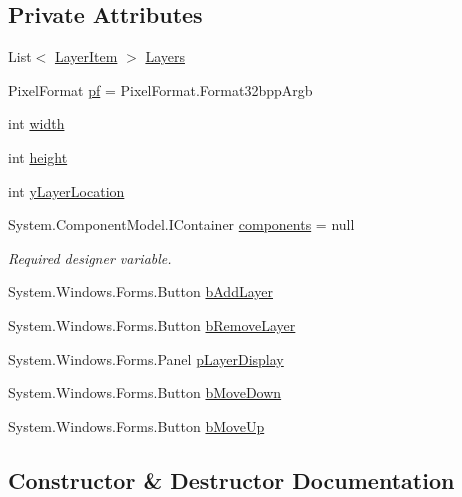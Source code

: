 \subsection*{Private Attributes}
\begin{DoxyCompactItemize}
\item 
List$<$ \mbox{\hyperlink{class_paint___program_1_1_layer_item}{Layer\+Item}} $>$ \mbox{\hyperlink{class_paint___program_1_1_layer_view_ac94fe6f338830996625a4e1c297f9c75}{Layers}}
\item 
Pixel\+Format \mbox{\hyperlink{class_paint___program_1_1_layer_view_acec4ede408dedde54bbc0faad679d1e6}{pf}} = Pixel\+Format.\+Format32bpp\+Argb
\item 
int \mbox{\hyperlink{class_paint___program_1_1_layer_view_ab92e792ae9f4af51ed5b57934bcde11e}{width}}
\item 
int \mbox{\hyperlink{class_paint___program_1_1_layer_view_aee179d5b2aaacd360854d9854cdda1b0}{height}}
\item 
int \mbox{\hyperlink{class_paint___program_1_1_layer_view_a4572b531bb2946727fc9a526f75b562d}{y\+Layer\+Location}}
\item 
System.\+Component\+Model.\+I\+Container \mbox{\hyperlink{class_paint___program_1_1_layer_view_aac66b9e83900bdaeec479b935b825252}{components}} = null
\begin{DoxyCompactList}\small\item\em Required designer variable. \end{DoxyCompactList}\item 
System.\+Windows.\+Forms.\+Button \mbox{\hyperlink{class_paint___program_1_1_layer_view_a8ca58fa9fa516110bddcd76b9577f116}{b\+Add\+Layer}}
\item 
System.\+Windows.\+Forms.\+Button \mbox{\hyperlink{class_paint___program_1_1_layer_view_a7b254e29d7a94cb0552ea83df6a0a45b}{b\+Remove\+Layer}}
\item 
System.\+Windows.\+Forms.\+Panel \mbox{\hyperlink{class_paint___program_1_1_layer_view_abd82f28fbd4532a9f141eea2b00598ba}{p\+Layer\+Display}}
\item 
System.\+Windows.\+Forms.\+Button \mbox{\hyperlink{class_paint___program_1_1_layer_view_a9862d49d934058a27b6a5bf66f618a0c}{b\+Move\+Down}}
\item 
System.\+Windows.\+Forms.\+Button \mbox{\hyperlink{class_paint___program_1_1_layer_view_af9aec4799746fd50bb01365269f3fd31}{b\+Move\+Up}}
\end{DoxyCompactItemize}


\subsection{Constructor \& Destructor Documentation}
\mbox{\label{class_paint___program_1_1_layer_view_a237468f9156f9a2dbdde7692209acb91}} 
